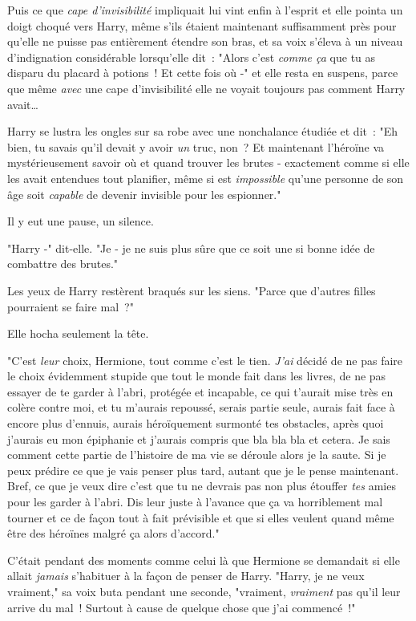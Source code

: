 Puis ce que \emph{cape d'invisibilité} impliquait lui vint enfin à l'esprit et elle pointa un doigt choqué vers Harry, même s'ils étaient maintenant suffisamment près pour qu'elle ne puisse pas entièrement étendre son bras, et sa voix s'éleva à un niveau d'indignation considérable lorsqu'elle dit~: "Alors c'est \emph{comme ça} que tu as disparu du placard à potions~! Et cette fois où -" et elle resta en suspens, parce que même \emph{avec} une cape d'invisibilité elle ne voyait toujours pas comment Harry avait…

Harry se lustra les ongles sur sa robe avec une nonchalance étudiée et dit~: "Eh bien, tu savais qu'il devait y avoir \emph{un} truc, non~? Et maintenant l'héroïne va mystérieusement savoir où et quand trouver les brutes - exactement comme si elle les avait entendues tout planifier, même si est \emph{impossible} qu'une personne de son âge soit \emph{capable} de devenir invisible pour les espionner."

Il y eut une pause, un silence.

"Harry -" dit-elle. "Je - je ne suis plus sûre que ce soit une si bonne idée de combattre des brutes."

Les yeux de Harry restèrent braqués sur les siens. "Parce que d'autres filles pourraient se faire mal~?"

Elle hocha seulement la tête.

"C'est \emph{leur} choix, Hermione, tout comme c'est le tien. \emph{J'ai} décidé de ne pas faire le choix évidemment stupide que tout le monde fait dans les livres, de ne pas essayer de te garder à l'abri, protégée et incapable, ce qui t'aurait mise très en colère contre moi, et tu m'aurais repoussé, serais partie seule, aurais fait face à encore plus d'ennuis, aurais héroïquement surmonté tes obstacles, après quoi j'aurais eu mon épiphanie et j'aurais compris que bla bla bla et cetera. Je sais comment cette partie de l'histoire de ma vie se déroule alors je la saute. Si je peux prédire ce que je vais penser plus tard, autant que je le pense maintenant. Bref, ce que je veux dire c'est que tu ne devrais pas non plus étouffer \emph{tes} amies pour les garder à l'abri. Dis leur juste à l'avance que ça va horriblement mal tourner et ce de façon tout à fait prévisible et que si elles veulent quand même être des héroïnes malgré ça alors d'accord."

C'était pendant des moments comme celui là que Hermione se demandait si elle allait \emph{jamais} s'habituer à la façon de penser de Harry. "Harry, je ne veux vraiment," sa voix buta pendant une seconde, "vraiment, \emph{vraiment} pas qu'il leur arrive du mal~! Surtout à cause de quelque chose que j'ai commencé~!"

